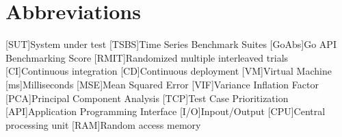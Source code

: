 \documentclass[a4paper, 11pt]{article}
\begin{document}
\clearpage
\tableofcontents
\clearpage
\listoffigures

\clearpage
\listoftables

\clearpage
\section*{Abbreviations}
\begin{acronym}
    [SUT]{System under test}
    [TSBS]{Time Series Benchmark Suites}
    [GoAbs]{Go API Benchmarking Score}
    [RMIT]{Randomized multiple interleaved trials}
    [CI]{Continuous integration}
    [CD]{Continuous deployment}
    [VM]{Virtual Machine}
    [ms]{Milliseconds}
    [MSE]{Mean Squared Error}
    [VIF]{Variance Inflation Factor}
    [PCA]{Principal Component Analysis}
    [TCP]{Test Case Prioritization}
    [API]{Application Programming Interface}
    [I/O]{Inpout/Output}
    [CPU]{Central processing unit}
    [RAM]{Random access memory}
\end{acronym}

\clearpage

\clearpage

\clearpage

\clearpage

\clearpage

\clearpage

\clearpage

\clearpage
\printbibliography
\end{document}
